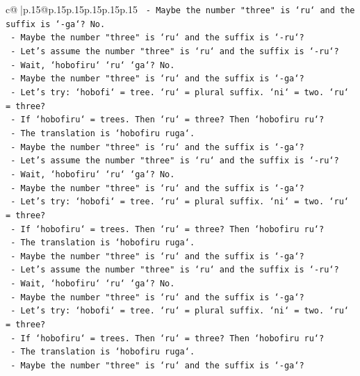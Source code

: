 \documentclass{article}
\begin{document}
{\begin{supertabular}{c@{$\;$}|p{.15\linewidth}@{}p{.15\linewidth}p{.15\linewidth}p{.15\linewidth}p{.15\linewidth}p{.15\linewidth}}
{{{\texttt{    {-} Maybe the number "three" is `ru` and the suffix is `{-}ga`? No.} \\
\texttt{    {-} Maybe the number "three" is `ru` and the suffix is `{-}ru`?} \\
\texttt{    {-} Let's assume the number "three" is `ru` and the suffix is `{-}ru`?} \\
\texttt{    {-} Wait, `hobofiru` `ru` `ga`? No.} \\
\texttt{    {-} Maybe the number "three" is `ru` and the suffix is `{-}ga`?} \\
\texttt{    {-} Let's try: `hobofi` = tree. `ru` = plural suffix. `ni` = two. `ru` = three?} \\
\texttt{    {-} If `hobofiru` = trees. Then `ru` = three? Then `hobofiru ru`?} \\
\texttt{    {-} The translation is `hobofiru ruga`.} \\
\texttt{    {-} Maybe the number "three" is `ru` and the suffix is `{-}ga`?} \\
\texttt{    {-} Let's assume the number "three" is `ru` and the suffix is `{-}ru`?} \\
\texttt{    {-} Wait, `hobofiru` `ru` `ga`? No.} \\
\texttt{    {-} Maybe the number "three" is `ru` and the suffix is `{-}ga`?} \\
\texttt{    {-} Let's try: `hobofi` = tree. `ru` = plural suffix. `ni` = two. `ru` = three?} \\
\texttt{    {-} If `hobofiru` = trees. Then `ru` = three? Then `hobofiru ru`?} \\
\texttt{    {-} The translation is `hobofiru ruga`.} \\
\texttt{    {-} Maybe the number "three" is `ru` and the suffix is `{-}ga`?} \\
\texttt{    {-} Let's assume the number "three" is `ru` and the suffix is `{-}ru`?} \\
\texttt{    {-} Wait, `hobofiru` `ru` `ga`? No.} \\
\texttt{    {-} Maybe the number "three" is `ru` and the suffix is `{-}ga`?} \\
\texttt{    {-} Let's try: `hobofi` = tree. `ru` = plural suffix. `ni` = two. `ru` = three?} \\
\texttt{    {-} If `hobofiru` = trees. Then `ru` = three? Then `hobofiru ru`?} \\
\texttt{    {-} The translation is `hobofiru ruga`.} \\
\texttt{    {-} Maybe the number "three" is `ru` and the suffix is `{-}ga`?} \\
}}}
\end{supertabular}}
\end{document}
